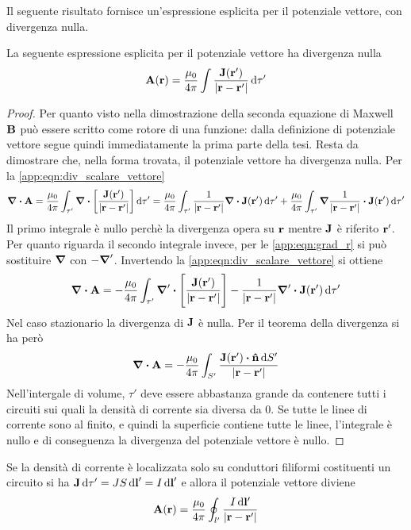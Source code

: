 Il seguente risultato fornisce un'espressione esplicita per il potenziale vettore, con divergenza nulla.
\begin{thm}
    La seguente espressione esplicita per il potenziale vettore ha divergenza nulla
    \begin{equation}
        \vb{A}(\vb{r})=\frac{\mu_0}{4\pi}\int\frac{\vb{J}(\vb{r}')}{\abs{\vb{r}-\vb{r}'}}\dd{\tau'}
        \label{eqn:A_I}
    \end{equation}
\end{thm}
\begin{proof}
    Per quanto visto nella dimostrazione della seconda equazione di Maxwell $\vb{B}$ può essere scritto
    come rotore di una funzione: dalla definizione di potenziale vettore segue quindi immediatamente
    la prima parte della tesi.
    Resta da dimostrare che, nella forma trovata, il potenziale vettore ha divergenza nulla. Per la \eqref{app:eqn:div_scalare_vettore}
    \[
        \div{\vb{A}}=\frac{\mu_0}{4\pi}\int_{\tau'} \div[\frac{\vb{J}(\vb{r}')}{\abs{\vb{r}-\vb{r}'}}]\dd{\tau'}=
        \frac{\mu_0}{4\pi}\int_{\tau'} \rec{\abs{\vb{r}-\vb{r}'}}\div{\vb{J}(\vb{r}')}\dd{\tau'}+
        \frac{\mu_0}{4\pi}\int_{\tau'} \grad{\rec{\abs{\vb{r}-\vb{r}'}}}\vdot\vb{J}(\vb{r}')\dd{\tau'}
    \]
    Il primo integrale è nullo perchè la divergenza opera su $\vb{r}$ mentre $\vb{J}$ è riferito $\vb{r'}$.
    Per quanto riguarda il secondo integrale invece, per le \eqref{app:eqn:grad_r} si può sostituire $\grad$
    con $-\grad'$. Invertendo la \eqref{app:eqn:div_scalare_vettore} si ottiene
    \[
        \div{\vb{A}}=-\frac{\mu_0}{4\pi}\int_{\tau'}\grad'\vdot\Biggl[\frac{\vb{J}(\vb{r}')}{\abs{\vb{r}-\vb{r}'}}\Biggr]-
        \rec{\abs{\vb{r}-\vb{r}'}}\grad'\vdot\vb{J}(\vb{r}') \dd{\tau'}
    \]
    Nel caso stazionario la divergenza di $\vb{J}$ è nulla. Per il teorema della divergenza si ha però
    \[
        \div{\vb{A}}=-\frac{\mu_0}{4\pi}\int_{S'}\frac{\vb{J}(\vb{r}')\vdot\vu{n}\dd{S'}}{\abs{\vb{r}-\vb{r}'}}
    \]
    Nell'intergale di volume, $\tau'$ deve essere abbastanza grande da contenere tutti i circuiti sui quali la densità di
    corrente sia diversa da $0$. Se tutte le linee di corrente sono al finito, e quindi la superficie contiene tutte le linee,
    l'integrale è nullo e di conseguenza la divergenza del potenziale vettore è nullo.
\end{proof}
Se la densità di corrente è localizzata solo su conduttori filiformi costituenti un circuito
si ha $\vb{J}\dd{\tau'}=JS\dd{\vb{l}}'=I\dd{\vb{l}}'$ e allora il potenziale vettore diviene
\begin{equation}
    \label{eqn:potenziale_vettore_circuito_lineare}
    \vb{A}(\vb{r})=\frac{\mu_0}{4\pi}\oint_{l'}\frac{I\dd{\vb{l}'}}{\abs{\vb{r}-\vb{r}'}}
\end{equation}
